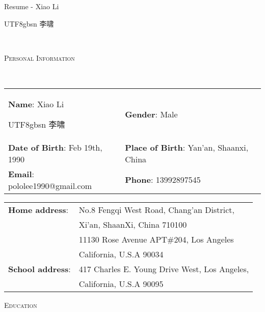 \documentclass[12pt]{article}
\newenvironment{changemargin}[2]{%
  \begin{list}{}{%
    \setlength{\topsep}{0pt}%
    \setlength{\leftmargin}{#1}%
    \setlength{\rightmargin}{#2}%
    \setlength{\listparindent}{\parindent}%
    \setlength{\itemindent}{\parindent}%
    \setlength{\parsep}{\parskip}%
  }%
  \item[]}{\end{list}
  }
\newcommand{\lineover}{
  \begin{changemargin}{-0.05in}{-0.05in}
  \vspace*{-8pt}
  \hrulefill \\
  \vspace*{-2pt}
  \end{changemargin}
  }
\newcommand{\header}[1]{
  \begin{changemargin}{-0.5in}{-0.5in}
  \scshape{#1}\\
  \lineover
  \end{changemargin}
  }
\newcommand{\contact}[1]{
  \begin{center}
  {\Large \scshape {#1}}\\ \smallskip
  \end{center}
  }
\newenvironment{body} {
  \vspace*{-16pt}
  \begin{changemargin}{-0.25in}{-0.5in}
  }
  {\end{changemargin}
  }
\begin{document}
\contact{Resume - Xiao Li
\begin{CJK}{UTF8}{gbsn}
李啸
\end{CJK}
}
\vspace{8pt}

\header{Personal Information}
\begin{body}
  \vspace{16pt}
  \begin{tabular}{ p{7cm} p{8cm} }
  \textbf{Name}: Xiao Li \begin{CJK}{UTF8}{gbsn} 李啸 \end{CJK} & \textbf{Gender}: Male \\
  \textbf{Date of Birth}: Feb 19th, 1990 & \textbf{Place of Birth}: Yan'an, Shaanxi, China \\
  \textbf{Email}: pololee1990@gmail.com & \textbf{Phone}: 13992897545 \\
  \end{tabular}
  \begin{tabular}{l l}
    \textbf{Home address}: & No.8 Fengqi West Road, Chang'an District, \\
    & Xi'an, ShaanXi, China  710100 \\
    & 11130 Rose Avenue APT\#204, Los Angeles \\
    & California, U.S.A 90034 \\
    \textbf{School address}: & 417 Charles E. Young Drive West, Los Angeles,\\
    & California, U.S.A 90095
  \end{tabular}

\end{body}

\smallskip


\header{Education}
\end{document}
